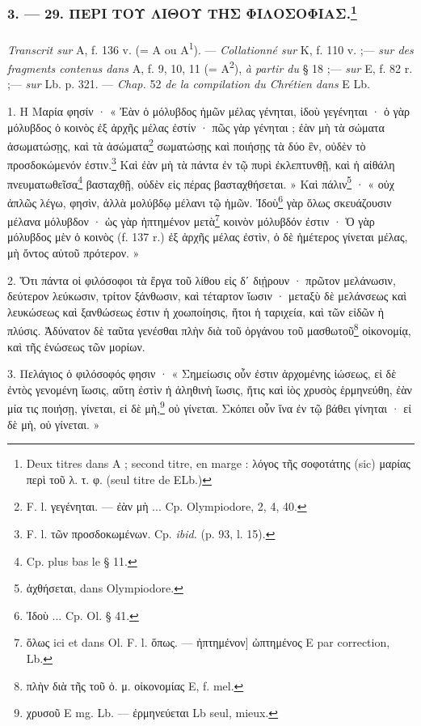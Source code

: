 \documentclass[landscape, a4paper, 11pt, oneside, polutonikogreek, french]{article}
\begin{document}
\bigskip
\centerline{\EightStarTaper}
\centerline{\EightStarTaper\EightStarTaper}
\bigskip

\subsubsection[3. --- 29. ΠΕΡΙ ΤΟΥ ΛΙΘΟΥ ΤΗΣ ΦΙΛΟΣΟΦΙΑΣ.]{3. --- 29. ΠΕΡΙ ΤΟΥ ΛΙΘΟΥ ΤΗΣ ΦΙΛΟΣΟΦΙΑΣ.\footnote{Deux titres dans A ; second titre, en marge : λόγος τῆς σοφοτάτης (sic) μαρίας περὶ τοῦ λ. τ. φ. (seul titre de ELb.)}}
\paragraph{}
\emph{Transcrit sur} A, f. 136 v. (= A ou A\textsuperscript{1}). --- \emph{Collationné sur} K, f. 110 v. ;--- \emph{sur des fragments contenus dans} A, f. 9, 10, 11 (= A\textsuperscript{2}), \emph{à partir du} § 18 ;--- \emph{sur} E, f. 82 r. ;--- \emph{sur} Lb. p. 321. --- \emph{Chap.} 52 \emph{de la compilation du Chrétien dans} E Lb.

\bigskip

1. Η Μαρία φησίν · « Ἐὰν ὁ μόλυβδος ἡμῶν μέλας γένηται, ἰδοὺ γεγένηται · ὁ γὰρ μόλυβδος ὁ κοινὸς ἐξ ἀρχῆς μέλας ἐστίν · πῶς γὰρ γένηται ; ἐὰν μὴ τὰ σώματα ἀσωματώσῃς, καὶ τὰ ἀσώματα\footnote{F. l. γεγένηται. --- ἐὰν μὴ ... Cp. Olympiodore, 2, 4, 40.} σωματώσῃς καὶ ποιήσῃς τὰ δύο ἓν, οὐδὲν τὸ προσδοκώμενόν ἐστιν.\footnote{F. l. τῶν προσδοκωμένων. Cp. \emph{ibid.} (p. 93, l. 15).} Καὶ ἐὰν μὴ τὰ πάντα ἐν τῷ πυρὶ ἐκλεπτυνθῇ, καὶ ἡ αἰθάλη πνευματωθεῖσα\footnote{Cp. plus bas le § 11.} βασταχθῇ, οὐδὲν εἰς πέρας βασταχθήσεται. » Καὶ πάλιν\footnote{ἀχθήσεται, dans Olympiodore.} · « οὐχ ἀπλῶς λέγω, φησὶν, ἀλλὰ μολύβδῳ μέλανι τῷ ἡμῶν. Ἰδοὺ\footnote{Ἰδοὺ ... Cp. Ol. § 41.} γὰρ ὅλως σκευάζουσιν μέλανα μόλυβδον · ὡς γὰρ ἠπτημένον μετὰ\footnote{ὅλως ici et dans Ol. F. l. ὅπως. --- ἠπτημένον] ὠπτημένος E par correction, Lb.} κοινὸν μόλυβδόν ἐστιν · Ὁ γὰρ μόλυβδος μὲν ὁ κοινὸς (f. 137 r.) ἐξ ἀρχῆς μέλας ἐστὶν, ὁ δὲ ἡμέτερος γίνεται μέλας, μὴ ὄντος αὐτοῦ πρότερον. »

2. Ὅτι πάντα οἱ φιλόσοφοι τὰ ἔργα τοῦ λίθου εἰς δʹ διῄρουν · πρῶτον μελάνωσιν, δεύτερον λεύκωσιν, τρίτον ξάνθωσιν, καὶ τέταρτον ἴωσιν · μεταξὺ δὲ μελάνσεως καὶ λευκώσεως καὶ ξανθώσεως ἐστιν ἡ χοωποίησις, ἤτοι ἡ ταριχεία, καὶ τῶν εἰδῶν ἡ πλύσις. Ἀδύνατον δὲ ταῦτα γενέσθαι πλὴν διὰ τοῦ ὀργάνου τοῦ μασθωτοῦ\footnote{πλὴν διὰ τῆς τοῦ ὀ. μ. οἰκονομίας E, f. mel.} οἰκονομίᾳ, καὶ τῆς ἑνώσεως τῶν μορίων.

3. Πελάγιος ὁ φιλόσοφός φησιν · « Σημείωσις οὖν ἐστιν ἀρχομένης ἰώσεως, εἰ δὲ ἐντὸς γενομένη ἴωσις, αὕτη ἐστὶν ἡ ἀληθινὴ ἴωσις, ἥτις καὶ ἰὸς χρυσὸς ἑρμηνεύθη, ἐὰν μία τις ποιήσῃ, γίνεται, εἰ δὲ μὴ,\footnote{χρυσοῦ E mg. Lb. --- ἐρμηνεύεται Lb seul, mieux.} οὐ γίνεται. Σκόπει οὖν ἵνα ἐν τῷ βάθει γίνηται · εἰ δὲ μὴ, οὐ γίνεται. »
\end{document}
